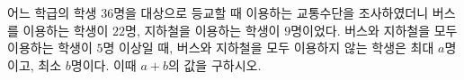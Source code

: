 어느 학급의 학생 $36$명을 대상으로 등교할 때 이용하는 교통수단을 조사하였더니 버스를 이용하는 학생이 $22$명, 지하철을 이용하는 학생이 $9$명이었다. 버스와 지하철을 모두 이용하는 학생이 $5$명 이상일 때, 버스와 지하철을 모두 이용하지 않는 학생은 최대 $a$명이고, 최소 $b$명이다. 이때 $a+b$의 값을 구하시오.
